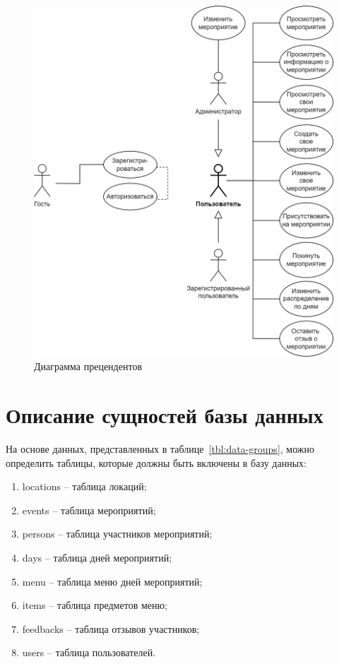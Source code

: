 \begin{figure}[h!]
	\centering
	\includegraphics[width=1\textwidth]{images/use-case-2.png}
	\caption{Диаграмма прецендентов} 
	\label{fig:use-case-diagram} 
\end{figure}

\section{Описание сущностей базы данных}

На основе данных, представленных в таблице~\ref{tbl:data-groups}, можно определить таблицы, которые должны быть включены в базу данных:
\begin{enumerate}
	\item locations -- таблица локаций;
	\item events -- таблица мероприятий;
	\item persons -- таблица участников мероприятий;
	\item days -- таблица дней мероприятий;
	\item menu -- таблица меню дней мероприятий;
	\item items -- таблица предметов меню;
	\item feedbacks -- таблица отзывов участников;
	\item users -- таблица пользователей.
\end{enumerate}

